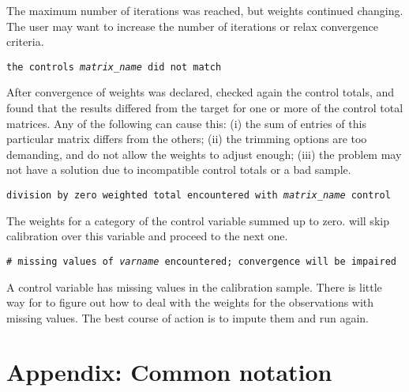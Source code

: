     \morehang
    The maximum number of iterations was reached, but weights continued
    changing. The user may want to increase the number of iterations
    or relax convergence criteria.

    \noindent
    {\tt the controls {\it matrix{\_}name} did not match}

    \morehang
    After convergence of weights was declared, 
    checked again the control totals, and found that the results
    differed from the target for one or more of the control total
    matrices. Any of the following can cause this: (i) the sum of
    entries of this particular matrix differs from the others;
    (ii) the trimming options are too demanding, and do not allow
    the weights to adjust enough; (iii) the problem may not have a
    solution due to incompatible control totals or a bad sample.

    \noindent
    {\tt division by zero weighted total encountered with
    {\it matrix{\_}name} control}

    \morehang
    The weights for a category of the control variable summed up
    to zero.  will skip calibration over this
    variable and proceed to the next one.

    \noindent
    {\tt \# missing values of {\it varname} encountered; convergence will be impaired}

    \morehang
    A control variable has missing values in the calibration sample.
    There is little way for  to figure out how to deal
    with the weights for the observations with missing values. The best course
    of action is to impute them and run  again.





% 


\appendix

\section*{Appendix: Common notation}

